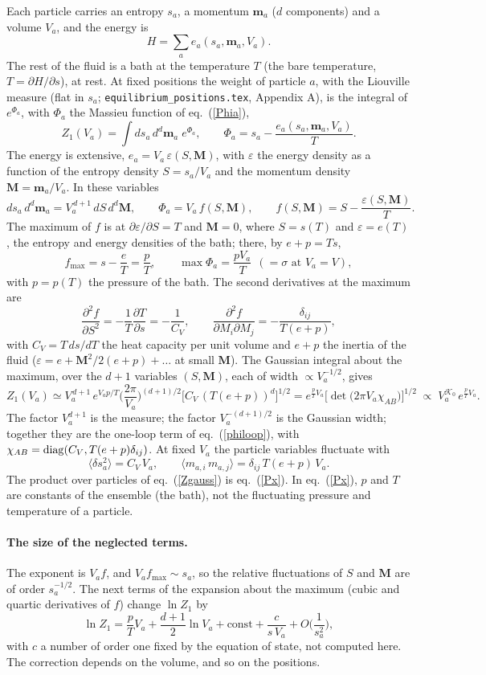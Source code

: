 \documentclass[11pt,aps,preprint,nofootinbib,superscriptaddress,tightenlines]{revtex4-2}
\newcommand{\avg}[1]{\langle #1\rangle}
\def\st{\begin{equation}}
\def\stp{\end{equation}}
\def\Eq#1{eq.~(\ref{#1})}
\let\oldparagraph\paragraph
\renewcommand{\paragraph}{\par\bigskip\oldparagraph}
\begin{document}
Each particle carries an entropy $s_a$, a momentum $\bm m_a$ ($d$ components) and a volume $V_a$, and the energy is
\st
H=\sum_ae_a(s_a,\bm m_a,V_a) .
\stp
The rest of the fluid is a bath at the temperature $T$ (the bare temperature, $T=\partial H/\partial s$), at rest.  At fixed positions the
weight of particle $a$, with the Liouville measure (flat in $s_a$; \texttt{equilibrium\_positions.tex}, Appendix A), is the integral of $e^{\Phi_a}$, with $\Phi_a$ the
Massieu function of \Eq{Phia},
\st
Z_1(V_a)=\int ds_a\,d^d\bm m_a\;e^{\Phi_a},\qquad \Phi_a=s_a-\frac{e_a(s_a,\bm m_a,V_a)}{T} .
\label{Za}
\stp
The energy is extensive, $e_a=V_a\,\varepsilon(S,\bm M)$, with $\varepsilon$ the energy density as a function of the entropy density
$S=s_a/V_a$ and the momentum density $\bm M=\bm m_a/V_a$.  In these variables
\st
ds_a\,d^d\bm m_a=V_a^{\,d+1}\,dS\,d^d\bm M,\qquad
\Phi_a=V_a\,f(S,\bm M),\qquad f(S,\bm M)=S-\frac{\varepsilon(S,\bm M)}{T} .
\stp
The maximum of $f$ is at $\partial\varepsilon/\partial S=T$ and $\bm M=0$, where $S=s(T)$ and $\varepsilon=e(T)$, the entropy and energy
densities of the bath; there, by $e+p=Ts$,
\st
f_{\max}=s-\frac eT=\frac{p}{T},\qquad \max\Phi_a=\frac{pV_a}{T}\ \ (=\sigma\text{ at }V_a=V),
\stp
with $p=p(T)$ the pressure of the bath.  The second derivatives at the maximum are
\st
\frac{\partial^2f}{\partial S^2}=-\frac1T\frac{\partial T}{\partial s}=-\frac1{C_V},\qquad
\frac{\partial^2f}{\partial M_i\partial M_j}=-\frac{\delta_{ij}}{T(e+p)},
\stp
with $C_V=T\,ds/dT$ the heat capacity per unit volume and $e+p$ the inertia of the fluid ($\varepsilon=e+\bm M^2/2(e+p)+\dots$ at small $\bm M$).
The Gaussian integral about the maximum, over the $d+1$ variables $(S,\bm M)$, each of width $\propto V_a^{-1/2}$, gives
\st
Z_1(V_a)\simeq V_a^{\,d+1}\,e^{V_ap/T}\Big(\frac{2\pi}{V_a}\Big)^{\!(d+1)/2}\big[C_V\,(T(e+p))^d\big]^{1/2}
=e^{\frac pTV_a}\big[\det\big(2\pi V_a\chi_{AB}\big)\big]^{1/2}\;\propto\;V_a^{\mathcal K_0}\,e^{\frac pTV_a} .
\label{Zgauss}
\stp
The factor $V_a^{d+1}$ is the measure; the factor $V_a^{-(d+1)/2}$ is the Gaussian width; together they are the one-loop term of \Eq{philoop}, with $\chi_{AB}={\rm diag}(C_V,T(e+p)\delta_{ij})$.  At fixed $V_a$ the particle variables fluctuate with
\st
\avg{\delta s_a^2}=C_V\,V_a,\qquad \avg{m_{a,i}\,m_{a,j}}=\delta_{ij}\,T(e+p)\,V_a .
\label{intrinsic}
\stp
The product over particles of \Eq{Zgauss} is \Eq{Px}.  In \Eq{Px}, $p$ and $T$ are constants of the ensemble (the bath), not the
fluctuating pressure and temperature of a particle.

\paragraph{The size of the neglected terms.}  The exponent is $V_a f$, and $V_af_{\max}\sim s_a$, so the relative fluctuations of $S$ and $\bm M$
are of order $s_a^{-1/2}$.  The next terms of the expansion about the maximum (cubic and quartic derivatives of $f$) change $\ln Z_1$ by
\st
\ln Z_1=\frac pTV_a+\frac{d+1}2\ln V_a+\text{const}+\frac{c}{s\,V_a}+O\Big(\frac1{s_a^2}\Big),
\label{Zcorr}
\stp
with $c$ a number of order one fixed by the equation of state, not computed here.  The correction depends on the volume, and so on the positions.
\end{document}
